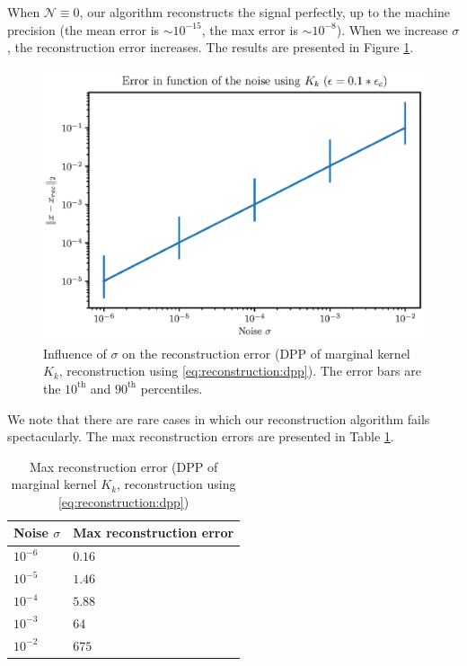 \documentclass{article}
\begin{document}
When $\mathcal{N} \equiv 0$, our algorithm reconstructs the signal perfectly, up to the machine precision (the mean error is $\sim 10^{-15}$, the max error is $\sim 10^{-8}$). When we increase $\sigma$, the reconstruction error increases. The results are presented in Figure \ref{fig:Kk:recerror}.


\begin{figure}[ht]
\centering
\includegraphics[height=8cm]{error_function_noise_Kk.eps}
\caption{Influence of $\sigma$ on the reconstruction error (DPP of marginal kernel $K_k$, reconstruction using \eqref{eq:reconstruction:dpp}). The error bars are the $10^\text{th}$ and $90^\text{th}$ percentiles.} \label{fig:Kk:recerror}
\end{figure}


We note that there are rare cases in which our reconstruction algorithm fails spectacularly. The max reconstruction errors are presented in Table \ref{tab:Kk:maxrecerror}. 


\begin{table}[ht]
  \caption{Max reconstruction error (DPP of marginal kernel $K_k$, reconstruction using \eqref{eq:reconstruction:dpp})}
  \label{tab:Kk:maxrecerror}
  \centering
  \begin{tabular}{ll}
    \toprule
    Noise $\sigma$ &  Max reconstruction error \\
    \midrule
    $10^{-6}$ & $0.16$ \\
    $10^{-5}$ & $1.46$ \\
    $10^{-4}$ & $5.88$ \\
		$10^{-3}$ & $64$ \\
		$10^{-2}$ & $675$ \\
    \bottomrule
  \end{tabular}
\end{table}
\end{document}
